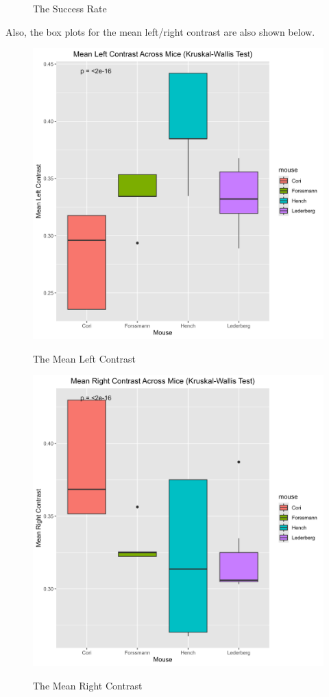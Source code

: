\documentclass{article}
\begin{document}
\begin{figure}[htbp]
\begin{minipage}[t]{0.48\textwidth}
			\caption{The Success Rate}
		\end{minipage}
	\end{figure}
	\par Also, the box plots for the mean left/right contrast are also shown below.
	\begin{figure}[htbp]
		\centering
		\begin{minipage}[t]{0.48\textwidth}
			\centering
			\includegraphics[scale=0.27]{Pics/013}\label{fig:1.13}
			\caption{The Mean Left Contrast}
		\end{minipage}
		\begin{minipage}[t]{0.48\textwidth}
			\centering
			\includegraphics[scale=0.27]{Pics/014}\label{fig:1.14}
			\caption{The Mean Right Contrast}
		\end{minipage}
	\end{figure}
\end{document}
